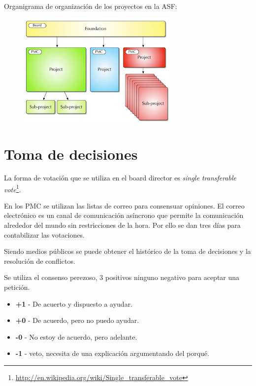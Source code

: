 \documentclass[11pt]{scrartcl}
\begin{document}
\par Organigrama de organización de los proyectos en la ASF:

\begin{figure}[htp]
\centering
\includegraphics[width=0.7\textwidth]{asf-structure.png}
\caption{}
\label{}
\end{figure}


\section{Toma de decisiones}
\label{sec:decisiones}

\par La forma de votación que se utiliza en el board director es \emph{single transferable vote}\footnote{\url{http://en.wikipedia.org/wiki/Single_transferable_vote}}.

\par En los PMC se utilizan las listas de correo para consensuar opiniones. El correo electrónico es un canal de comunicación asíncrono que permite la comunicación alrededor del mundo sin restricciones de la hora. Por ello se dan tres días para contabilizar las votaciones.

\par Siendo medios públicos se puede obtener el histórico de la toma de decisiones y la resolución de conflictos.

\par Se utiliza el consenso perezoso, 3 positivos ninguno negativo para aceptar una petición.

\begin{itemize}
	\item \textbf{+1} - De acuerto y dispuesto a ayudar.
	\item \textbf{+0} - De acuerdo, pero no puedo ayudar.
	\item \textbf{-0} - No estoy de acuerdo, pero adelante.
	\item \textbf{-1} - veto, necesita de una explicación argumentando del porqué.
\end{itemize}
\end{document}
